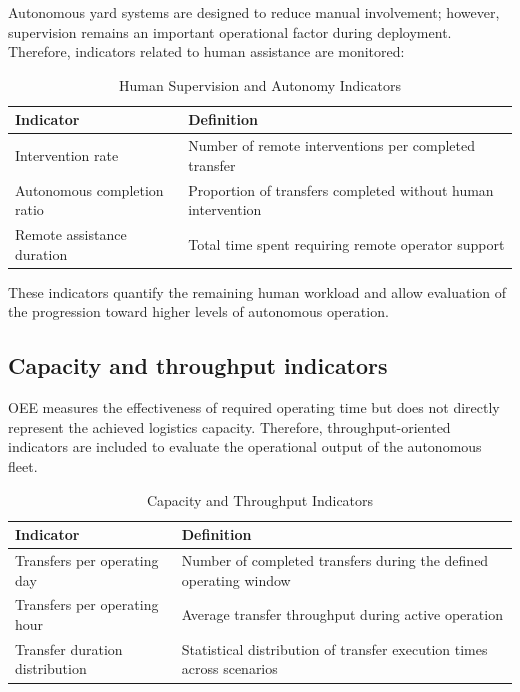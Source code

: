 Autonomous yard systems are designed to reduce manual involvement; however, supervision remains an important operational factor during deployment. Therefore, indicators related to human assistance are monitored:

\begin{table}[H]
\small
\renewcommand{\arraystretch}{1.4}
\centering
\caption{Human Supervision and Autonomy Indicators}
\label{tab:human-supervision-indicators}
\begin{tabular}{|p{5.0cm}|p{9.0cm}|}
\hline
\textbf{Indicator} & \textbf{Definition} \\
\hline
Intervention rate & Number of remote interventions per completed transfer \\
\hline
Autonomous completion ratio & Proportion of transfers completed without human intervention \\
\hline
Remote assistance duration & Total time spent requiring remote operator support \\
\hline
\end{tabular}
\end{table}

These indicators quantify the remaining human workload and allow evaluation of the progression toward higher levels of autonomous operation.

\subsection{Capacity and throughput indicators}

OEE measures the effectiveness of required operating time but does not directly represent the achieved logistics capacity. Therefore, throughput-oriented indicators are included to evaluate the operational output of the autonomous fleet.

\begin{table}[H]
\small
\renewcommand{\arraystretch}{1.4}
\centering
\caption{Capacity and Throughput Indicators}
\label{tab:capacity-throughput-indicators}
\begin{tabular}{|p{5.0cm}|p{9.0cm}|}
\hline
\textbf{Indicator} & \textbf{Definition} \\
\hline
Transfers per operating day & Number of completed transfers during the defined operating window \\
\hline
Transfers per operating hour & Average transfer throughput during active operation \\
\hline
Transfer duration distribution & Statistical distribution of transfer execution times across scenarios \\
\hline
\end{tabular}
\end{table}

